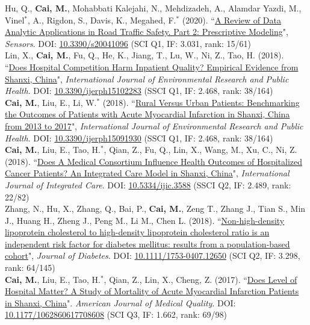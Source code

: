 \documentclass[11pt, a4paper]{article}
\newcommand{\years}[1]{\marginnote{\scriptsize #1}}
\begin{document}
\years{2020}Hu, Q., \textbf{Cai, M.}, Mohabbati Kalejahi, N., Mehdizadeh, A., Alamdar Yazdi, M., Vinel$^\ast$, A., Rigdon, S., Davis, K., Megahed, F.$^\ast$ (2020). ``\ul{A Review of Data Analytic Applications in Road Traffic Safety. Part 2: Prescriptive Modeling}", \emph{Sensors}. DOI: \href{https://doi.org/10.3390/s20041096}{10.3390/s20041096} (SCI Q1, IF: 3.031, rank: 15/61)\\[6pt]
\years{2018}Lin, X., \textbf{Cai, M.}, Fu, Q., He, K., Jiang, T., Lu, W., Ni, Z., Tao, H. (2018). ``\ul{Does Hospital Competition Harm Inpatient Quality? Empirical Evidence from Shanxi, China}", \emph{International Journal of Environmental Research and Public Health}. DOI: \href{https://doi.org/10.3390/ijerph15102283}{10.3390/ijerph15102283} (SSCI Q1, IF: 2.468, rank: 38/164)\\[6pt]
\years{2018}\textbf{Cai, M.}, Liu, E., Li, W.$^\ast$ (2018). ``\ul{Rural Versus Urban Patients: Benchmarking the Outcomes of Patients with Acute Myocardial Infarction in Shanxi, China from 2013 to 2017}", \emph{International Journal of Environmental Research and Public Health}. DOI: \href{https://doi.org/10.3390/ijerph15091930}{10.3390/ijerph15091930} (SSCI Q1, IF: 2.468, rank: 38/164)\\[6pt]
\years{2018}\textbf{Cai, M.}, Liu, E., Tao, H.$^\ast$, Qian, Z., Fu, Q., Lin, X., Wang, M., Xu, C., Ni, Z. (2018). ``\ul{Does A Medical Consortium Influence Health Outcomes of Hospitalized Cancer Patients? An Integrated Care Model in Shanxi, China}", \emph{International Journal of Integrated Care}. DOI: \href{https://doi.org/10.5334/ijic.3588}{10.5334/ijic.3588} (SSCI Q2, IF: 2.489, rank: 22/82)\\[6pt]
\years{2018}Zhang, N., Hu, X., Zhang, Q., Bai, P., \textbf{Cai, M.}, Zeng T., Zhang J., Tian S., Min J., Huang H., Zheng J., Peng M., Li M., Chen L. (2018). ``\ul{Non-high-density lipoprotein cholesterol to high-density lipoprotein cholesterol ratio is an independent risk factor for diabetes mellitus: results from a population-based cohort}", \emph{Journal of Diabetes}. DOI: \href{https://doi.org/10.1111/1753-0407.12650}{10.1111/1753-0407.12650} (SCI Q2, IF: 3.298, rank: 64/145)\\[6pt]
\years{2017}\textbf{Cai, M.}, Liu, E., Tao, H.$^\ast$, Qian, Z., Lin, X., Cheng, Z. (2017). ``\ul{Does Level of Hospital Matter? A Study of Mortality of Acute Myocardial Infarction Patients in Shanxi, China}". \emph{American Journal of Medical Quality}. DOI: \href{https://doi.org/10.1177/1062860617708608}{10.1177/1062860617708608} (SCI Q3, IF: 1.662, rank: 69/98)\\[6pt]
\end{document}
